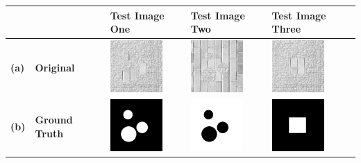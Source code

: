 \begin{minipage}{\linewidth}
	\begin{center}
	
		\begin{tabular}{>{\bfseries\centering}m{0.2in} >{\centering\bfseries}m{1in} >{\centering}m{1in} >{\centering}m{1in} >{\centering\arraybackslash}m{1in}}
			\hline
			&
			&
			\textbf{Test Image One}
			&
			\textbf{Test Image Two}
			&
			\textbf{Test Image Three}
			\\ 
			\hline
			(a)
			&
			Original
			&
			\includegraphics[width=75px, frame]{figures/accuracy_maps/original_brick_gravel_01.png}
			&
			\includegraphics[width=75px, frame]{figures/accuracy_maps/original_brick_gravel_02.png}
			& 
			\includegraphics[width=75px, frame]{figures/accuracy_maps/original_brick_gravel_03.png}
			\\ 
			\hline
			(b)
			&
			Ground Truth
			&
			\includegraphics[width=75px, frame]{figures/accuracy_maps/ground_truth_brick_gravel_01.png}
			&
			\includegraphics[width=75px, frame]{figures/accuracy_maps/ground_truth_brick_gravel_02.png}
			& 
			\includegraphics[width=75px, frame]{figures/accuracy_maps/ground_truth_brick_gravel_03.png}

\end{tabular}
\end{center}
\end{minipage}
